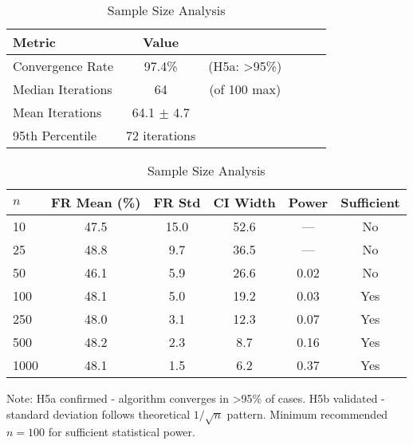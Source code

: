 \begin{table}[htbp]
\centering
\caption{Sample Size and Convergence Analysis (Experiment 6.5)}
\label{tab:sample_size_convergence}

\begin{subtable}{\textwidth}
\centering
\caption{Convergence Test Results}
\begin{tabular}{lccccc}
\toprule
Metric & Value & & & & \\
\midrule
Convergence Rate & 97.4\% & (H5a: >95\%) & & & \\
Median Iterations & 64 & (of 100 max) & & & \\
Mean Iterations & 64.1 $\pm$ 4.7 & & & & \\
95th Percentile & 72 iterations & & & & \\
\bottomrule
\end{tabular}
\end{subtable}

\vspace{1em}

\begin{subtable}{\textwidth}
\centering
\caption{Sample Size Analysis}
\begin{tabular}{lccccc}
\toprule
$n$ & FR Mean (\%) & FR Std & CI Width & Power & Sufficient \\
\midrule
10 & 47.5 & 15.0 & 52.6 & --- & No \\
25 & 48.8 & 9.7 & 36.5 & --- & No \\
50 & 46.1 & 5.9 & 26.6 & 0.02 & No \\
100 & 48.1 & 5.0 & 19.2 & 0.03 & Yes \\
250 & 48.0 & 3.1 & 12.3 & 0.07 & Yes \\
500 & 48.2 & 2.3 & 8.7 & 0.16 & Yes \\
1000 & 48.1 & 1.5 & 6.2 & 0.37 & Yes \\
\bottomrule
\end{tabular}
\end{subtable}

\vspace{0.5em}

\footnotesize Note: H5a confirmed - algorithm converges in >95\% of cases.
H5b validated - standard deviation follows theoretical $1/\sqrt{n}$ pattern.
Minimum recommended $n=100$ for sufficient statistical power.
\end{table}
